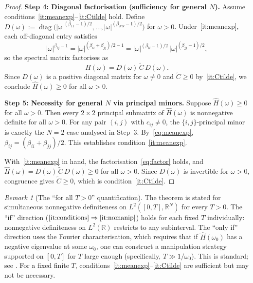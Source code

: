 \documentclass[12pt]{article}
\theoremstyle{definition}
\theoremstyle{remark}
\newtheorem{remark}[theorem]{Remark}
\newcommand{\R}{\mathbb{R}}
\newcommand{\bC}{\widetilde{C}}
\newcommand{\diag}{\operatorname{diag}}
\begin{document}
\begin{proof}
\medskip
\noindent\textbf{Step 4: Diagonal factorisation (sufficiency for general $N$).}
Assume conditions~\ref{it:meanexp}--\ref{it:Ctilde} hold.
Define $D(\omega) := \diag\bigl(|\omega|^{(\beta_{11}-1)/2},\dots,|\omega|^{(\beta_{NN}-1)/2}\bigr)$
for $\omega>0$.  Under~\ref{it:meanexp}, each off-diagonal entry satisfies
\[
  |\omega|^{\beta_{ij}-1}
  = |\omega|^{(\beta_{ii}+\beta_{jj})/2-1}
  = |\omega|^{(\beta_{ii}-1)/2}\,|\omega|^{(\beta_{jj}-1)/2},
\]
so the spectral matrix factorises as
\begin{equation}\label{eq:factor}
  \widehat{H}(\omega) = D(\omega)\,\bC\,D(\omega).
\end{equation}
Since $D(\omega)$ is a positive diagonal matrix for $\omega\neq 0$ and $\bC\ge 0$
by~\ref{it:Ctilde}, we conclude $\widehat{H}(\omega)\ge 0$ for all $\omega>0$.

\medskip
\noindent\textbf{Step 5: Necessity for general $N$ via principal minors.}
Suppose $\widehat{H}(\omega)\ge 0$ for all $\omega>0$.  Then every $2\times 2$ principal
submatrix of $\widehat{H}(\omega)$ is nonnegative definite for all $\omega>0$.
For any pair $(i,j)$ with $c_{ij}\neq 0$, the $\{i,j\}$-principal minor is exactly the
$N=2$ case analysed in Step~3.  By~\eqref{eq:meanexp}, $\beta_{ij}=(\beta_{ii}+\beta_{jj})/2$.
This establishes condition~\ref{it:meanexp}.

With~\ref{it:meanexp} in hand, the factorisation~\eqref{eq:factor} holds, and
$\widehat{H}(\omega)=D(\omega)\,\bC\,D(\omega)\ge 0$ for all $\omega>0$.
Since $D(\omega)$ is invertible for $\omega>0$, congruence gives $\bC\ge 0$, which
is condition~\ref{it:Ctilde}.
\end{proof}

\begin{remark}[The ``for all $T>0$'' quantification]\label{rem:finiteT}
The theorem is stated for simultaneous nonnegative definiteness on $L^2([0,T],\R^N)$
for every $T>0$.  The ``if'' direction ($\ref{it:conditions}\Rightarrow\ref{it:nomanip}$)
holds for each fixed $T$ individually: nonnegative definiteness on $L^2(\R)$ restricts to
any subinterval.  The ``only if'' direction uses the Fourier characterisation, which requires
that if $\widehat{H}(\omega_0)$ has a negative eigenvalue at some $\omega_0$, one can
construct a manipulation strategy supported on $[0,T]$ for $T$ large enough
(specifically, $T\gg 1/\omega_0$).  This is standard; see
\cite[\S2]{AlfonsiKlockSchied2016}.
For a fixed finite $T$, conditions~\ref{it:meanexp}--\ref{it:Ctilde} are sufficient but may
not be necessary.
\end{remark}
\end{document}
